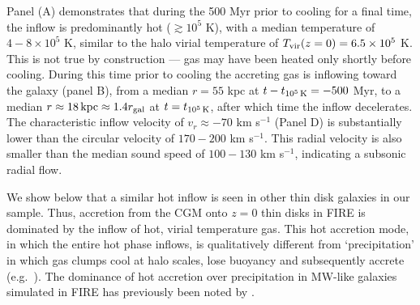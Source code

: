 \documentclass[fleqn,usenatbib]{mnras}
\newcommand{\tcools}{t_{10^5\,{\rm K}}}
\newcommand{\Tvir}{T_{\rm vir}}
\begin{document}
Panel (A) demonstrates that during the 500 Myr prior to cooling for a final time, the inflow is predominantly hot ($\gtrsim 10^5$ K), with a median temperature of $4-8\times10^5$ K, similar to the halo virial temperature of $\Tvir(z=0)=6.5\times10^5$ K.
This is not true by construction --- gas may have been heated only shortly before cooling.
During this time prior to cooling the accreting gas is inflowing toward the galaxy (panel B), from a median $r=55$ kpc at $t-\tcools=-500$ Myr, to a median $r\approx18\,{\rm kpc}\approx1.4 r_{\rm gal}$ at $t=\tcools$, after which time the inflow decelerates.
The characteristic inflow velocity of $v_r \approx-70$ km s$^{-1}$ (Panel D) is substantially lower than the circular velocity of $170-200$ km s$^{-1}$.
This radial velocity is also smaller than the median sound speed of $100-130$ km s$^{-1}$, indicating a subsonic radial flow. 


We show below that a similar hot inflow is seen in other thin disk galaxies in our sample.
Thus, accretion from the CGM onto $z=0$ thin disks in FIRE is dominated by the inflow of hot, virial temperature gas.
This hot accretion mode, in which the entire hot phase inflows, is qualitatively different from `precipitation' in which gas clumps cool at halo scales, lose buoyancy and subsequently accrete (e.g.~\citealt{Maller2004,Voit2017}). The dominance of hot accretion over precipitation in MW-like galaxies simulated in FIRE has previously been noted by \cite{Esmerian2021}. 
\end{document}
